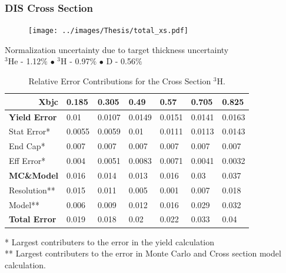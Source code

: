 \documentclass[12pt,usenames,dvipsnames]{beamer}
\begin{document}
\begin{frame}{}
\frametitle{DIS Cross Section}
\centering
\vspace{-20pt}
\begin{figure}
	\texttt{[image: ../images/Thesis/total\_xs.pdf]}
\end{figure}

Normalization uncertainty due to target thickness uncertainty\\
$^3$He - 1.12$\%$ $\bullet$ $^3$H - 0.97$\%$ $\bullet$  D - 0.56$\%$
\end{frame}
\begin{frame}{}

\begin{table}[]
	\caption*{Relative Error Contributions for the Cross Section $^3$H.}
	\begin{tabular}{|p{2.2cm}|l|l|l|l|l|l|}
\hline
\multicolumn{1}{|r|}{\textbf{Xbjc}} & \textbf{0.185} & \textbf{0.305} & \textbf{0.49} & \textbf{0.57} & \textbf{0.705} & \textbf{0.825} \\ \hline
\textbf{Yield Error}                & 0.01           & 0.0107         & 0.0149        & 0.0151        & 0.0141         & 0.0163         \\ \hline
Stat Error*                         & 0.0055         & 0.0059         & 0.01          & 0.0111        & 0.0113         & 0.0143         \\ \hline
End Cap*                            & 0.007          & 0.007          & 0.007         & 0.007         & 0.007          & 0.007          \\ \hline
Eff Error*                          & 0.004          & 0.0051         & 0.0083        & 0.0071        & 0.0041         & 0.0032         \\ \hline\hline
\textbf{MC\&Model}                  & 0.016          & 0.014          & 0.013         & 0.016         & 0.03           & 0.037          \\ \hline
Resolution**                        & 0.015          & 0.011          & 0.005         & 0.001         & 0.007          & 0.018          \\ \hline
Model**                             & 0.006          & 0.009          & 0.012         & 0.016         & 0.029          & 0.032          \\ \hline\hline
\textbf{Total Error}                & 0.019          & 0.018          & 0.02          & 0.022         & 0.033          & 0.04           \\ \hline
\end{tabular}

	* Largest contributers to the error in the yield calculation\\
	** Largest contributers to the error in Monte Carlo and Cross section model calculation. 

\end{table}


\end{frame}
\end{document}

